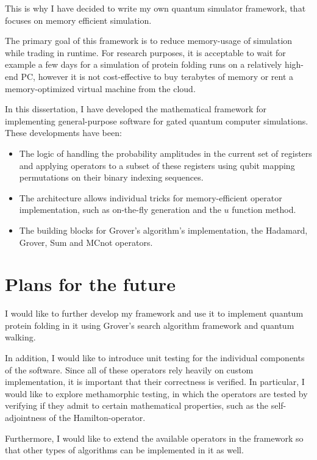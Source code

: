 This is why I have decided to write my own quantum simulator framework, that focuses on memory efficient simulation.

The primary goal of this framework is to reduce memory-usage of simulation while trading in runtime. For research purposes, it is acceptable to wait for example a few days for a simulation of protein folding runs on a relatively high-end PC, however it is not cost-effective to buy terabytes of memory or rent a memory-optimized virtual machine from the cloud.

In this dissertation, I have developed the mathematical framework for implementing general-purpose software for gated quantum computer simulations. These developments have been:

\begin{itemize}
    \item The logic of handling the probability amplitudes in the current set of registers and applying operators to a subset of these registers using qubit mapping permutations on their binary indexing sequences.
    \item The architecture allows individual tricks for memory-efficient operator implementation, such as on-the-fly generation and the $u$ function method.
    \item The building blocks for Grover's algorithm's implementation, the Hadamard, Grover, Sum and MCnot operators.
\end{itemize}

\section{Plans for the future}

I would like to further develop my framework and use it to implement quantum protein folding in it using Grover's search algorithm framework and quantum walking.

In addition, I would like to introduce unit testing for the individual components of the software. Since all of these operators rely heavily on custom implementation, it is important that their correctness is verified. In particular, I would like to explore methamorphic testing, in which the operators are tested by verifying if they admit to certain mathematical properties, such as the self-adjointness of the Hamilton-operator.

Furthermore, I would like to extend the available operators in the framework so that other types of algorithms can be implemented in it as well.
